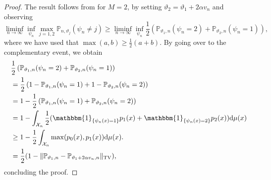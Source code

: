 \documentclass[a4paper]{article}
\begin{document}
\begin{proof}
	The result follows from  for $M=2$, by setting $\vartheta_2=\vartheta_1 + 2 \alpha v_n$ and observing
	\begin{equation*}
		\liminf_{n\rightarrow \infty} \inf_{\psi_n} \max_{j=1,2}\mathbb{P}_{n,\vartheta_j}(\psi_n \neq j) \geq \liminf_{n\rightarrow \infty} \inf_{\psi_n} \frac{1}{2}\left(\mathbb{P}_{\vartheta_1,n}(\psi_n = 2) + \mathbb{P}_{\vartheta_2, n}(\psi_n = 1)\right),
	\end{equation*}
	where we have used that $\max(a,b) \geq \frac{1}{2}(a+b)$. By going over to the complementary event, we obtain
	\begin{equation*}
		\begin{aligned}
			 & \frac{1}{2}\left(\mathbb{P}_{\vartheta_1,n}(\psi_n = 2) + \mathbb{P}_{\vartheta_2, n}(\psi_n = 1)\right)           \\
			 & =\frac{1}{2}\left( 1 - \mathbb{P}_{\vartheta_1,n}(\psi_n=1) + 1- \mathbb{P}_{\vartheta_2,n}(\psi_n=2)\right)       \\
			 & =1 - \frac{1}{2}\left(\mathbb{P}_{\vartheta_1,n}(\psi_n=1)+ \mathbb{P}_{\vartheta_2,n}(\psi_n=2)\right)            \\
			 & =1 - \int_{\mathcal{X}_n} \frac{1}{2}(\mathbbm{1}_{\{\psi_{n}(x)=1\}
			}p_1(x) + \mathbbm{1}_{\{\psi_{n}(x)=2\}
			}p_2(x) ) \mathrm{d}\mu(x)                                                                                            \\
			 & \geq 1 - \frac{1}{2}\int_{\mathcal{X}_n} \max(p_0(x), p_1(x))\mathrm{d}\mu(x).                                     \\
			 & = \frac{1}{2}(1-\Vert \mathbb{P}_{\vartheta_1,n} -  \mathbb{P}_{\vartheta_1 + 2\alpha v_n, n}\Vert_{\mathrm{TV}}),
		\end{aligned}
	\end{equation*}
	concluding the proof.
\end{proof}
\end{document}
